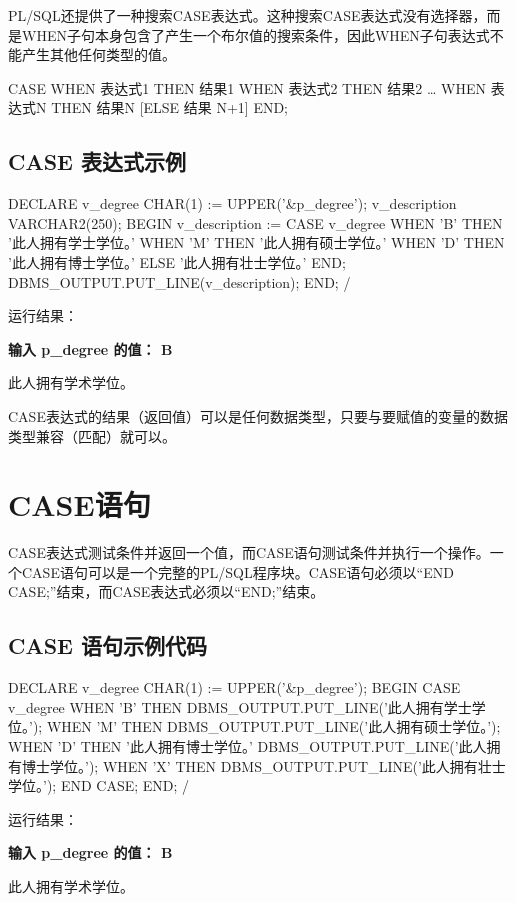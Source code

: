 \documentclass[11pt, a4paper, oneside, UTF8]{ctexbook}
\let\kaishu\relax %
\begin{document}
PL/SQL还提供了一种搜索CASE表达式。这种搜索CASE表达式没有选择器，而是WHEN子句本身包含了产生一个布尔值的搜索条件，因此WHEN子句表达式不能产生其他任何类型的值。

\begin{plsql}[caption=不带选择器]
CASE
  WHEN 表达式1 THEN 结果1
  WHEN 表达式2 THEN 结果2
  …
  WHEN 表达式N THEN 结果N
  [ELSE 结果 N+1]
END;
\end{plsql}
\subsection{CASE 表达式示例}
\begin{plsql}[caption=CASE示例代码]
DECLARE
  v_degree CHAR(1) := UPPER('&p_degree');
  v_description VARCHAR2(250);
BEGIN
  v_description := 
    CASE v_degree
      WHEN 'B' THEN '此人拥有学士学位。'
      WHEN 'M' THEN '此人拥有硕士学位。'
      WHEN 'D' THEN '此人拥有博士学位。'
      ELSE '此人拥有壮士学位。'
    END;
  DBMS_OUTPUT.PUT_LINE(v_description);
END;
/
\end{plsql}
运行结果：

{\bfseries\kaishu 输入 p\_degree 的值： B

此人拥有学术学位。}

CASE表达式的结果（返回值）可以是任何数据类型，只要与要赋值的变量的数据类型兼容（匹配）就可以。

\section{CASE语句}
CASE表达式测试条件并返回一个值，而CASE语句测试条件并执行一个操作。一个CASE语句可以是一个完整的PL/SQL程序块。CASE语句必须以“END CASE;”结束，而CASE表达式必须以“END;”结束。
\subsection{CASE 语句示例代码}
\begin{plsql}
DECLARE
  v_degree CHAR(1) := UPPER('&p_degree');
BEGIN
  CASE v_degree
    WHEN 'B' THEN 
      DBMS_OUTPUT.PUT_LINE('此人拥有学士学位。');
    WHEN 'M' THEN 
      DBMS_OUTPUT.PUT_LINE('此人拥有硕士学位。');
    WHEN 'D' THEN '此人拥有博士学位。'
      DBMS_OUTPUT.PUT_LINE('此人拥有博士学位。');
    WHEN 'X' THEN
      DBMS_OUTPUT.PUT_LINE('此人拥有壮士学位。');
  END CASE;
END;
/
\end{plsql}
运行结果：

{\bfseries\kaishu 输入 p\_degree 的值： B

此人拥有学术学位。}
\end{document}
